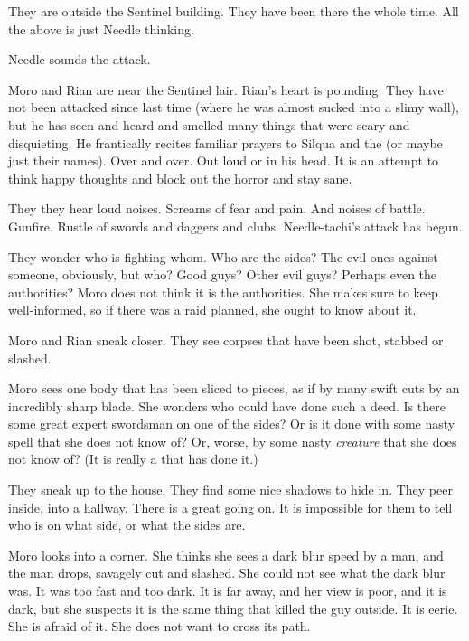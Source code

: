 They are outside the Sentinel building. 
They have been there the whole time.
All the above is just Needle thinking. 

Needle sounds the attack. 





\begin{comment}
  \section{Moro and Rian find Needle}
\end{comment}
\new
Moro and Rian are near the Sentinel lair. 
Rian's heart is pounding.
They have not been attacked since last time (where he was almost sucked into a slimy wall), but he has seen and heard and smelled many things that were scary and disquieting. 
He frantically recites familiar prayers to Silqua and the \sephiroth (or maybe just their names).
Over and over. 
Out loud or in his head.
It is an attempt to think happy thoughts and block out the horror and stay sane. 

They they hear loud noises.
Screams of fear and pain.
And noises of battle. 
Gunfire. 
Rustle of swords and daggers and clubs. 
Needle-tachi's attack has begun. 

They wonder who is fighting whom. 
Who are the sides?
The evil ones against someone, obviously, but who?
Good guys?
Other evil guys? 
Perhaps even the authorities?
Moro does not think it is the authorities. 
She makes sure to keep well-informed, so if there was a raid planned, she ought to know about it. 

Moro and Rian sneak closer. 
They see corpses that have been shot, stabbed or slashed. 

Moro sees one body that has been sliced to pieces, as if by many swift cuts by an incredibly sharp blade. 
She wonders who could have done such a deed. 
Is there some great expert swordsman on one of the sides?
Or is it done with some nasty spell that she does not know of?
Or, worse, by some nasty \emph{creature} that she does not know of?
(It is really a \bane that has done it.)

They sneak up to the house. 
They find some nice shadows to hide in. 
They peer inside, into a hallway. 
There is a great \melee going on.
It is impossible for them to tell who is on what side, or what the sides are. 

Moro looks into a corner.
She thinks she sees a dark blur speed by a man, and the man drops, savagely cut and slashed.
She could not see what the dark blur was.
It was too fast and too dark.
It is far away, and her view is poor, and it is dark, but she suspects it is the same thing that killed the guy outside. 
It is eerie.
She is afraid of it.
She does not want to cross its path. 





